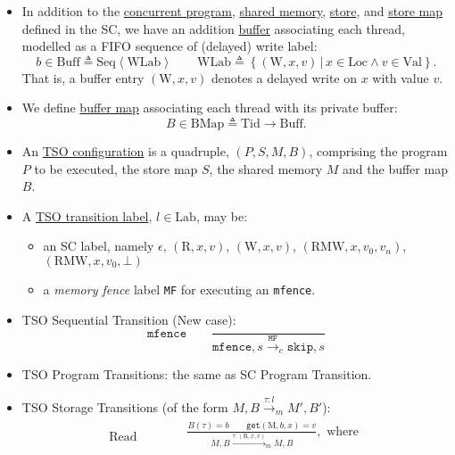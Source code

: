 \documentclass[twocolumn,landscape,10pt]{article}
\theoremstyle{definition}
\begin{document}
\begin{itemize}
    \item In addition to the \underline{concurrent program}, \underline{shared memory}, 
        \underline{store}, and \underline{store map} defined in the SC,
        we have an addition \underline{buffer} associating each thread,
        modelled as a FIFO sequence of (delayed) write label:
        \[
            b\in\text{Buff}\triangleq\text{Seq}\left\langle\text{WLab}\right\rangle
            \qquad\text{WLab}\triangleq\left\{(\text{W},x,v)\,|\,x\in\text{Loc}\wedge
            v\in\text{Val}\right\}.
        \]
        That is, a buffer entry $(\text{W},x,v)$ denotes a delayed write on $x$
        with value $v$.
    \item We define \underline{buffer map} associating each thread with its
        private buffer:
        \[
            B\in\text{BMap}\triangleq\text{Tid}\rightarrow\text{Buff}.
        \]
    \item An \underline{TSO configuration} is a quadruple, $(P,S,M,B)$,
        comprising the program $P$ to be executed, the store map $S$, the shared
        memory $M$ and the buffer map $B$.
    \item A \underline{TSO transition label}, $l\in\text{Lab}$, may be:
        \begin{itemize}
            \item an SC label, namely $\epsilon$, $(\text{R},x,v)$,
                $(\text{W},x,v)$, $(\text{RMW},x,v_0,v_n)$,
                $(\text{RMW},x,v_0,\bot)$
            \item a \emph{memory fence} label \texttt{MF} for executing an
                \texttt{mfence}.
        \end{itemize} 
    \item TSO Sequential Transition (New case):
        \[
            \texttt{mfence} \qquad \frac{}
            {\texttt{mfence},s\xrightarrow{\texttt{MF}}_c\texttt{skip},s}
        \]
    \item TSO Program Transitions: the same as SC Program Transition.
    \item TSO Storage Transitions 
        (of the form $M,B\xrightarrow{\tau:l}_m M',B'$):
        \begin{align*}
            \text{Read}\qquad&
            \begin{aligned}
                &\frac{B(\tau)=b\qquad\texttt{get}(\text{M},b,x)=v}
                {M,B\xrightarrow{\tau:(\text{R},x,v)}_m M,B},\text{ where}\\[0.5em]

\end{aligned}
\end{align*}
\end{itemize}
\end{document}
